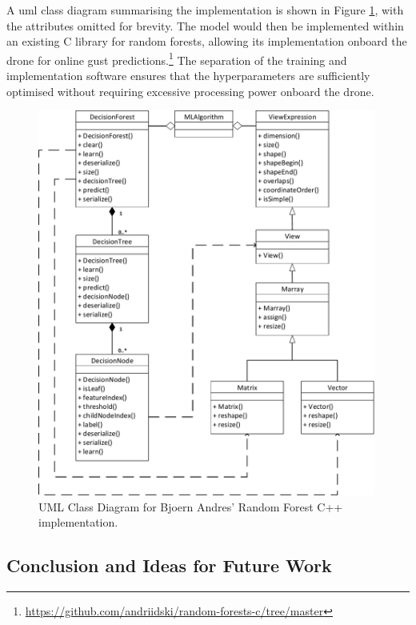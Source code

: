A \gls{uml} class diagram summarising the implementation is shown in Figure \ref{fig:uml}, with the attributes omitted for brevity. The model would then be implemented within an existing C library for random forests, allowing its implementation onboard the drone for online gust predictions.\footnote{\url{https://github.com/andriidski/random-forests-c/tree/master}} The separation of the training and implementation software ensures that the hyperparameters are sufficiently optimised without requiring excessive processing power onboard the drone.

\begin{figure}[H]
\centering
\includegraphics[width=0.99\textwidth]{figs/Samuel/Figures/UML Random Forest-cropped.pdf}
\caption{UML Class Diagram for Bjoern Andres' Random Forest C++ implementation.}
\label{fig:uml}
\end{figure}




\subsection{Conclusion and Ideas for Future Work}

